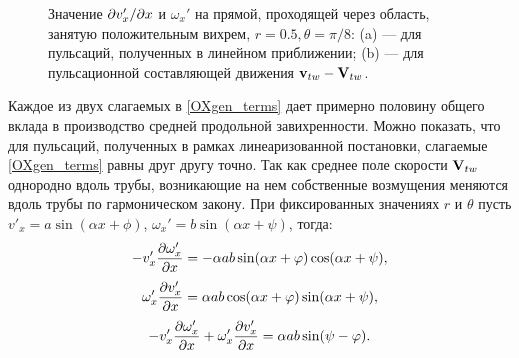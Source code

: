 \begin{figure}
\caption{Значение $\partial v_x' /\partial x$ и $\omega_x'$ на прямой, проходящей через область, занятую положительным вихрем, $r = 0.5, \theta = \pi/8$: (a) --- для пульсаций, полученных в линейном приближении; (b) --- для пульсационной составляющей движения $\mathbf{v}_{tw} - \mathbf{V}_{tw}$. }
\label{OXgen_corr_pic}
\end{figure}


Каждое из двух слагаемых в \eqref{OXgen_terms} дает примерно половину общего вклада в производство средней продольной завихренности. Можно показать, что для пульсаций, полученных в рамках линеаризованной постановки, слагаемые \eqref{OXgen_terms} равны друг другу точно. Так как среднее поле скорости $\mathbf{V}_{tw}$ однородно вдоль трубы, возникающие на нем собственные возмущения меняются вдоль трубы по гармоническом закону. При фиксированных значениях $r$ и $\theta$ пусть  $v'_x = a \sin(\alpha x + \phi)$, $\omega_x' = b \sin(\alpha x + \psi)$, тогда:
\begin{equation} \label{OXgen_iterms_1}
 - v'_x \frac{\partial \omega'_x}{\partial x} = - \alpha a b \sin(\alpha x + \varphi) \cos(\alpha x + \psi),
\end{equation}
\begin{equation} \label{OXgen_iterms_2}
\omega'_x \frac{\partial v'_x}{\partial x} =  \alpha a b \cos(\alpha x + \varphi) \sin(\alpha x + \psi),
\end{equation}
\begin{equation} \label{OXgen_iterms_sum}
 - v'_x \frac{\partial \omega'_x}{\partial x} + \omega'_x \frac{\partial v'_x}{\partial x} = \alpha a b \sin(\psi - \varphi).
\end{equation}
